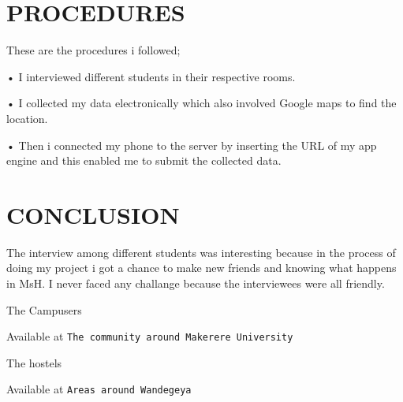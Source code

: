 \documentclass[14pt]{article}
\begin{document}
\section{PROCEDURES}
These are the procedures i followed;

•	I interviewed different students in their respective rooms.\par 
•	I collected my data electronically which also involved Google maps to find the location.\par
•	Then i connected my phone to the server by inserting the URL of my app engine and this enabled me to submit the collected data.\par

 

\section{CONCLUSION}
The interview among different students was interesting because in the process of doing my project i got a chance to make new friends and knowing what happens in MsH. I never faced any challange because the interviewees were all friendly.\par

\begin{thebibliography}{10}

 The Campusers

Available at \texttt{The community around Makerere University }

 The hostels

Available at \texttt{Areas around Wandegeya }



\end{thebibliography}
\end{document}
